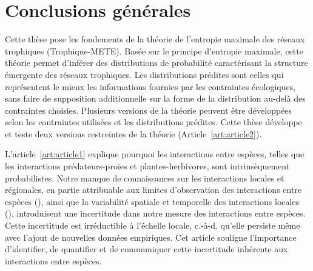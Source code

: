 
\francais   

\chapter{Conclusions générales}


Cette thèse pose les fondements de la théorie de l'entropie maximale des réseaux
trophiques (Trophique-METE). Basée sur le principe d'entropie maximale, cette
théorie permet d'inférer des distributions de probabilité caractérisant la
structure émergente des réseaux trophiques. Les distributions prédites sont
celles qui représentent le mieux les informations fournies par les contraintes
écologiques, sans faire de supposition additionnelle sur la forme de la
distribution au-delà des contraintes choisies. Plusieurs versions de la théorie
peuvent être développées selon les contraintes utilisées et les distributions
prédites. Cette thèse développe et teste deux versions restreintes de la théorie
(Article~\ref{art:article2}). 

L'article~\ref{art:article1} explique pourquoi les interactions entre espèces,
telles que les interactions prédateurs-proies et plantes-herbivores, sont
intrinsèquement probabilistes. Notre manque de connaissances sur les
interactions locales et régionales, en partie attribuable aux limites
d'observation des interactions entre espèces (\cite{Jordano2016Sampling}), ainsi
que la variabilité spatiale et temporelle des interactions locales
(\cite{Poisot2015Species}), introduisent une incertitude dans notre mesure des
interactions entre espèces. Cette incertitude est irréductible à l'échelle
locale, c.-à-d. qu'elle persiste même avec l'ajout de nouvelles données
empiriques. Cet article souligne l'importance d'identifier, de quantifier et de
communiquer cette incertitude inhérente aux interactions entre espèces. 

